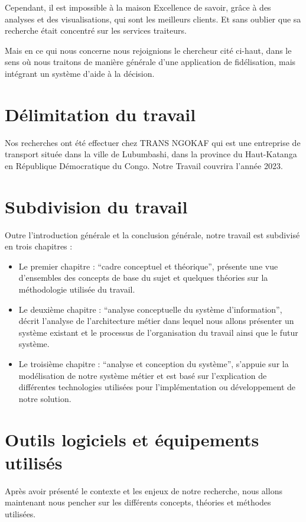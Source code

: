     Cependant, il est impossible à la maison Excellence de savoir, grâce à des analyses et des visualisations, qui
    sont les meilleurs clients. Et sans oublier que sa recherche était concentré sur les services traiteurs. 
    \newline

    Mais en ce qui nous concerne nous rejoignions le chercheur cité ci-haut, dans le sens où nous traitons de manière
    générale d’une application de fidélisation, mais intégrant un système d’aide à la décision.
    \section[Délimitation du travail]{Délimitation du travail}
        Nos recherches ont été effectuer chez TRANS NGOKAF qui est une entreprise de transport
        située dans la ville de Lubumbashi, dans la province du Haut-Katanga en République Démocratique du Congo.
        \newline
        Notre Travail couvrira l’année 2023.
    \section[Subdivision du travail]{Subdivision du travail}
    Outre l’introduction générale et la conclusion générale, notre travail est subdivisé
    en trois chapitres :
    \newline
        \begin{itemize}
            \item [\ding{226}] Le premier chapitre : \enquote{cadre conceptuel et théorique}, présente une vue
            d’ensembles des concepts de base du sujet et quelques théories sur la méthodologie
            utilisée du travail.
            \newline
            \item [\ding{226}] Le deuxième chapitre : \enquote{analyse conceptuelle du système d’information}, 
            décrit l’analyse de l’architecture métier dans lequel nous allons présenter un système existant
            et le processus de l’organisation du travail ainsi que le futur système.
            \newline       
            \item [\ding{226}] Le troisième chapitre : \enquote{analyse et conception du système}, s’appuie sur la
            modélisation de notre système métier et est basé sur l’explication de différentes
            technologies utilisées pour l’implémentation ou développement de notre solution.            
        \end{itemize} 
    \section[Outils logiciels et équipements utilisés]{Outils logiciels et équipements utilisés}
    Après avoir présenté le contexte et les enjeux de notre recherche, nous allons maintenant nous pencher sur
    les différents concepts, théories et méthodes utilisées.